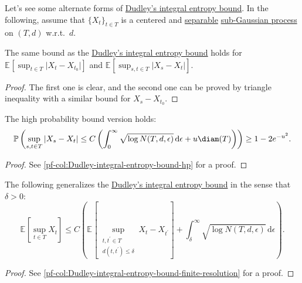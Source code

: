 Let's see some alternate forms of \hyperref[col:Dudley-integral-entropy-bound]{Dudley's integral entropy bound}. In the following, assume that \(\{ X_t \} _{t\in T}\) is a centered and \hyperref[def:separable]{separable} \hyperref[def:sub-Gaussian-process]{sub-Gaussian process} on \((T, d)\) w.r.t.\ \(d\).

\begin{corollary}\label{col:Dudley-integral-entropy-bound-difference}
	The same bound as the \hyperref[col:Dudley-integral-entropy-bound]{Dudley's integral entropy bound} holds for \(\mathbb{E}_{}\left[\sup _{t\in T} \vert X_t - X_{t_0} \vert \right]\) and \(\mathbb{E}_{}\left[\sup _{s, t\in T} \vert X_s - X_t \vert \right]\).
\end{corollary}
\begin{proof}
	The first one is clear, and the second one can be proved by triangle inequality with a similar bound for \(X_s - X_{t_0}\).
\end{proof}

\begin{corollary}\label{col:Dudley-integral-entropy-bound-hp}
	The high probability bound version holds:
	\[
		\mathbb{P} \left(
		\sup _{s, t\in T} \vert X_s - X_t \vert
		\leq C \left( \int_{0}^{\infty} \sqrt{\log N(T, d, \epsilon )}  \,\mathrm{d}\epsilon + u \diam(T) \right)
		\right) \geq 1 - 2 e^{-u^2}.
	\]
\end{corollary}
\begin{proof}
	See \autoref{pf-col:Dudley-integral-entropy-bound-hp} for a proof.
\end{proof}

\begin{corollary}\label{col:Dudley-integral-entropy-bound-finite-resolution}
	The following generalizes the \hyperref[col:Dudley-integral-entropy-bound]{Dudley's integral entropy bound} in the sense that \(\delta > 0\):
	\[
		\mathbb{E}_{}\left[\sup _{t\in T} X_t \right]
		\leq C  \left( \mathbb{E}_{}\left[ \sup _{\substack{t, t^{\prime} \in T \\ d(t, t^{\prime} ) \leq \delta }} X_t - X_{t^{\prime} } \right] + \int_{\delta }^{\infty} \sqrt{\log N(T, d, \epsilon )} \,\mathrm{d}\epsilon \right) .
	\]
\end{corollary}
\begin{proof}
	See \autoref{pf-col:Dudley-integral-entropy-bound-finite-resolution} for a proof.
\end{proof}

